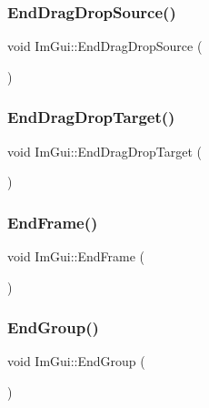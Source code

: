 \hypertarget{namespace_im_gui_a02f225fefff2a046038ed99ab20606da}{}\label{namespace_im_gui_a02f225fefff2a046038ed99ab20606da} 
\subsubsection{\texorpdfstring{End\+Drag\+Drop\+Source()}{EndDragDropSource()}}
{\footnotesize\ttfamily void Im\+Gui\+::\+End\+Drag\+Drop\+Source (\begin{DoxyParamCaption}{ }\end{DoxyParamCaption})}

\hypertarget{namespace_im_gui_ae8313266214728f86c2cb7cb30a30e89}{}\label{namespace_im_gui_ae8313266214728f86c2cb7cb30a30e89} 
\subsubsection{\texorpdfstring{End\+Drag\+Drop\+Target()}{EndDragDropTarget()}}
{\footnotesize\ttfamily void Im\+Gui\+::\+End\+Drag\+Drop\+Target (\begin{DoxyParamCaption}{ }\end{DoxyParamCaption})}

\hypertarget{namespace_im_gui_a246c37da45e88a12ade440a0feacb4ee}{}\label{namespace_im_gui_a246c37da45e88a12ade440a0feacb4ee} 
\subsubsection{\texorpdfstring{End\+Frame()}{EndFrame()}}
{\footnotesize\ttfamily void Im\+Gui\+::\+End\+Frame (\begin{DoxyParamCaption}{ }\end{DoxyParamCaption})}

\hypertarget{namespace_im_gui_a05fc97fc64f28a55486087f503d9a622}{}\label{namespace_im_gui_a05fc97fc64f28a55486087f503d9a622} 
\subsubsection{\texorpdfstring{End\+Group()}{EndGroup()}}
{\footnotesize\ttfamily void Im\+Gui\+::\+End\+Group (\begin{DoxyParamCaption}{ }\end{DoxyParamCaption})}

